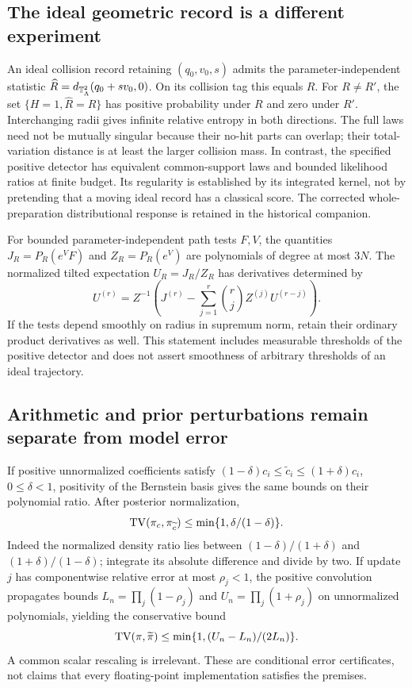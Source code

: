 \subsection{The ideal geometric record is a different experiment}
An ideal collision record retaining $(q_0,v_0,s)$ admits the parameter-independent statistic
$\widehat R=d_{\mathbb T_\Lambda^2}(q_0+sv_0,0)$. On its collision tag this equals $R$. For $R\ne R'$, the set $\{H=1,\widehat R=R\}$ has positive probability under $R$ and zero under $R'$. Interchanging radii gives infinite relative entropy in both directions. The full laws need not be mutually singular because their no-hit parts can overlap; their total-variation distance is at least the larger collision mass. In contrast, the specified positive detector has equivalent common-support laws and bounded likelihood ratios at finite budget. Its regularity is established by its integrated kernel, not by pretending that a moving ideal record has a classical score. The corrected whole-preparation distributional response is retained in the historical companion.

For bounded parameter-independent path tests $F,V$, the quantities $J_R=P_R(e^VF)$ and $Z_R=P_R(e^V)$ are polynomials of degree at most $3N$. The normalized tilted expectation $U_R=J_R/Z_R$ has derivatives determined by
\[
 U^{(r)}=Z^{-1}\left(J^{(r)}-\sum_{j=1}^r\binom rj Z^{(j)}U^{(r-j)}\right).
\]
If the tests depend smoothly on radius in supremum norm, retain their ordinary product derivatives as well. This statement includes measurable thresholds of the positive detector and does not assert smoothness of arbitrary thresholds of an ideal trajectory.

\subsection{Arithmetic and prior perturbations remain separate from model error}
If positive unnormalized coefficients satisfy
$(1-\delta)c_i\le\widetilde c_i\le(1+\delta)c_i$, $0\le\delta<1$, positivity of the Bernstein basis gives the same bounds on their polynomial ratio. After posterior normalization,
\begin{equation}
 \operatorname{TV}(\pi_c,\pi_{\widetilde c})\le\min\{1,\delta/(1-\delta)\}.
 \label{eq:roundoff}
\end{equation}
Indeed the normalized density ratio lies between $(1-\delta)/(1+\delta)$ and $(1+\delta)/(1-\delta)$; integrate its absolute difference and divide by two. If update $j$ has componentwise relative error at most $\rho_j<1$, the positive convolution propagates bounds $L_n=\prod_j(1-\rho_j)$ and $U_n=\prod_j(1+\rho_j)$ on unnormalized polynomials, yielding the conservative bound
\[
 \operatorname{TV}(\pi,\widetilde\pi)\le\min\{1,(U_n-L_n)/(2L_n)\}.
\]
A common scalar rescaling is irrelevant. These are conditional error certificates, not claims that every floating-point implementation satisfies the premises.

